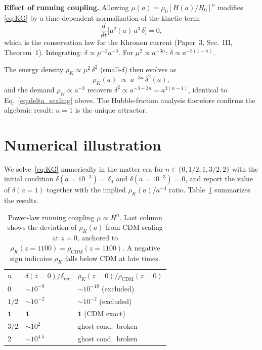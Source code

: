 \documentclass[prd,twocolumn,superscriptaddress,longbibliography,floatfix]{revtex4-2}
\newcommand{\Hzero}{H_{0}}
\newcommand{\muzero}{\mu_{0}}
\begin{document}
\textbf{Effect of running coupling.}  Allowing
$\mu(a) = \muzero[H(a)/\Hzero]^{n}$ modifies
\eqref{eq:KG} by a time-dependent normalization of the
kinetic term:
\begin{equation}
\frac{d}{dt}\!\bigl[\mu^{2}(a)\,a^{3}\,\dot{\delta}\bigr]
= 0,
\label{eq:conservation_mu}
\end{equation}
which is the conservation law for the Khronon current
(Paper~3, Sec.~III, Theorem~1).
Integrating: $\dot{\delta} \propto \mu^{-2}a^{-3}$.
For $\mu^{2} \propto a^{-3n}$:
$\dot{\delta} \propto a^{-3(1-n)}$.

The energy density $\rho_{K} \propto \mu^{2}\,\delta^{2}$
(small-$\delta$) then evolves as
\begin{equation}
\rho_{K}(a) \;\propto\; a^{-3n}\,\delta^{2}(a),
\label{eq:rhoK_scaling}
\end{equation}
and the demand $\rho_{K} \propto a^{-3}$ recovers
$\delta^{2} \propto a^{-3+3n} = a^{3(n-1)}$, identical
to Eq.~\eqref{eq:delta_scaling} above.  The
Hubble-friction analysis therefore confirms the
algebraic result: $n = 1$ is the unique attractor.

\section{Numerical illustration}
\label{sec:numerics}

We solve~\eqref{eq:KG} numerically in the matter era
for $n \in \{0, 1/2, 1, 3/2, 2\}$ with the initial
condition $\delta(a = 10^{-3}) = \delta_{0}$ and
$\dot{\delta}(a = 10^{-3}) = 0$, and report the value
of $\delta(a = 1)$ together with the implied
$\rho_{K}(a)/a^{-3}$ ratio.  Table~\ref{tab:running}
summarizes the results.

\begin{table}[b]
\caption{\label{tab:running}Power-law running coupling
$\mu \propto H^{n}$.  Last column shows the deviation
of $\rho_{K}(a)$ from CDM scaling at $z = 0$, anchored
to $\rho_{K}(z = 1100) = \rho_{\mathrm{CDM}}(z = 1100)$.
A negative sign indicates $\rho_{K}$ falls below
CDM at late times.}
\begin{ruledtabular}
\begin{tabular}{lll}
$n$ & $\delta(z=0)/\delta_{\mathrm{rec}}$
  & $\rho_{K}(z{=}0)/\rho_{\mathrm{CDM}}(z{=}0)$ \\
\colrule
$0$         & $\sim\!10^{-9}$  & $\sim\!10^{-18}$
  (excluded) \\
$1/2$       & $\sim\!10^{-2}$  & $\sim\!10^{-2}$
  (excluded) \\
$\mathbf{1}$ & $\mathbf{1}$    & $\mathbf{1}$
  (CDM exact) \\
$3/2$       & $\sim\!10^{2}$   & ghost cond.\ broken \\
$2$         & $\sim\!10^{4.5}$ & ghost cond.\ broken \\
\end{tabular}
\end{ruledtabular}
\end{table}
\end{document}
